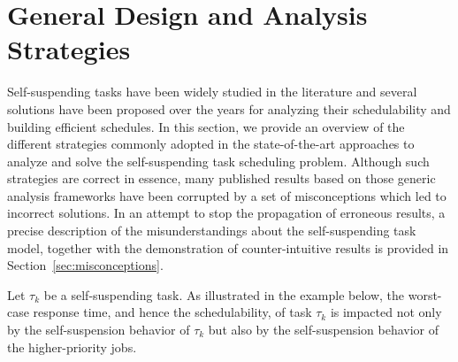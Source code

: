 
\section{General Design and Analysis Strategies}
\label{sec:review}

Self-suspending tasks have been widely studied in the literature and several solutions have been proposed over the years for 
analyzing their schedulability and building efficient schedules. In this section, we provide an overview of the different 
strategies commonly adopted in the state-of-the-art approaches to analyze and solve the self-suspending task scheduling problem. Although such strategies are
correct in essence, many published results based on those generic analysis frameworks have been corrupted by a set of 
misconceptions which led to incorrect solutions. In an attempt to stop the propagation of erroneous results, a precise 
description of the misunderstandings about the self-suspending task model, together with the demonstration of 
counter-intuitive results is provided in Section~\ref{sec:misconceptions}.


Let $\tau_k$ be a self-suspending task.
As illustrated in the example below, the worst-case response time, and hence the schedulability, of task $\tau_k$ is impacted not only by 
the self-suspension behavior of $\tau_k$ but also by the self-suspension behavior of  the higher-priority jobs.


